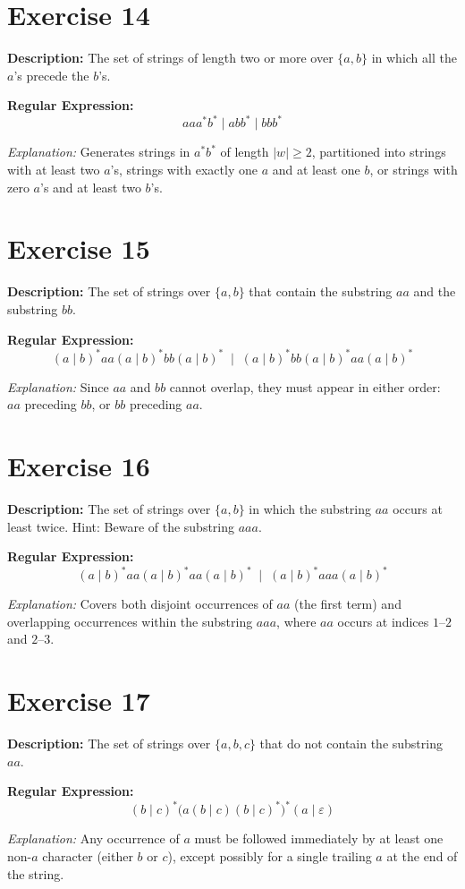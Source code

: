 \documentclass[12pt]{article}
\newcommand{\exercisedescription}[1]{%
    \Needspace{4\baselineskip}%
    \noindent\textbf{Description:} #1\par
    \vspace{0.25cm}
}
\newcommand{\reexpression}[1]{%
    \noindent\textbf{Regular Expression:}
    \vspace{-0.25cm}
    \begin{equation*}
        #1
    \end{equation*}
    \vspace{-0.15cm}
}
\newcommand{\reexplanation}[1]{%
    \noindent\textit{Explanation:} #1\par
    \vspace{0.55cm}
}
\begin{document}
\section*{Exercise 14}
\exercisedescription{%
    The set of strings of length two or more over $\{a,b\}$ in which all the $a$'s precede the $b$'s.
}
\reexpression{%
    a a a^* b^* \mid a b b^* \mid b b b^*
}
\reexplanation{%
    Generates strings in $a^* b^*$ of length $|w| \ge 2$, partitioned into strings with at least two $a$'s, strings with exactly one $a$ and at least one $b$, or strings with zero $a$'s and at least two $b$'s.
}


\section*{Exercise 15}
\exercisedescription{%
    The set of strings over $\{a,b\}$ that contain the substring $aa$ and the substring $bb$.
}
\reexpression{%
    (a \mid b)^* aa (a \mid b)^* bb (a \mid b)^* \;\mid\; (a \mid b)^* bb (a \mid b)^* aa (a \mid b)^*
}
\reexplanation{%
    Since $aa$ and $bb$ cannot overlap, they must appear in either order: $aa$ preceding $bb$, or $bb$ preceding $aa$.
}
\newpage


\section*{Exercise 16}
\exercisedescription{%
    The set of strings over $\{a,b\}$ in which the substring $aa$ occurs at least twice. Hint: Beware of the substring $aaa$.
}
\reexpression{%
    (a \mid b)^* aa (a \mid b)^* aa (a \mid b)^* \;\mid\; (a \mid b)^* aaa (a \mid b)^*
}
\reexplanation{%
    Covers both disjoint occurrences of $aa$ (the first term) and overlapping occurrences within the substring $aaa$, where $aa$ occurs at indices $1$--$2$ and $2$--$3$.
}


\section*{Exercise 17}
\exercisedescription{%
    The set of strings over $\{a,b,c\}$ that do not contain the substring $aa$.
}
\reexpression{%
    (b \mid c)^* \big(a (b \mid c)(b \mid c)^*\big)^* (a \mid \varepsilon)
}
\reexplanation{%
    Any occurrence of $a$ must be followed immediately by at least one non-$a$ character (either $b$ or $c$), except possibly for a single trailing $a$ at the end of the string.
}
\end{document}
